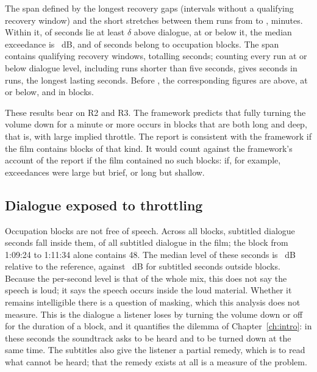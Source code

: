 
The span defined by the longest recovery gaps (intervals without a qualifying recovery window) and the short stretches between them runs from \xSpanStart{} to \xSpanEnd, \xSpanMin{} minutes. Within it, \xSpanExceedShare{} of seconds lie at least $\delta$ above dialogue, \xSpanAtOrBelowShare{} at or below it, the median exceedance is \xSpanMedianRel~dB, and \xSpanInBlockShare{} of seconds belong to occupation blocks. The span contains \xSpanRecoveryWindows{} qualifying recovery windows, totalling \xSpanRecoverySeconds{} seconds; counting every run at or below dialogue level, including runs shorter than five seconds, gives \xSpanLowSeconds{} seconds in \xSpanLowRuns{} runs, the longest lasting \xSpanLowLongest{} seconds. Before \xSpanStart, the corresponding figures are \xBeforeExceedShare{} above, \xBeforeAtOrBelowShare{} at or below, and \xBeforeInBlockShare{} in blocks.

These results bear on R2 and R3. The framework predicts that fully turning the volume down for a minute or more occurs in blocks that are both long and deep, that is, with large implied throttle. The report is consistent with the framework if the film contains blocks of that kind. It would count against the framework's account of the report if the film contained no such blocks: if, for example, exceedances were large but brief, or long but shallow.

\subsection{Dialogue exposed to throttling}

Occupation blocks are not free of speech. Across all blocks, \resSubInBlocks{} subtitled dialogue seconds fall inside them, \resSubInBlocksShare{} of all subtitled dialogue in the film; the block from 1:09:24 to 1:11:34 alone contains 48. The median level of these seconds is \xDlgInBlockMedian~dB relative to the reference, against \xDlgOutBlockMedian~dB for subtitled seconds outside blocks. Because the per-second level is that of the whole mix, this does not say the speech is loud; it says the speech occurs inside the loud material. Whether it remains intelligible there is a question of masking, which this analysis does not measure. This is the dialogue a listener loses by turning the volume down or off for the duration of a block, and it quantifies the dilemma of Chapter~\ref{ch:intro}: in these seconds the soundtrack asks to be heard and to be turned down at the same time. The subtitles also give the listener a partial remedy, which is to read what cannot be heard; that the remedy exists at all is a measure of the problem.

